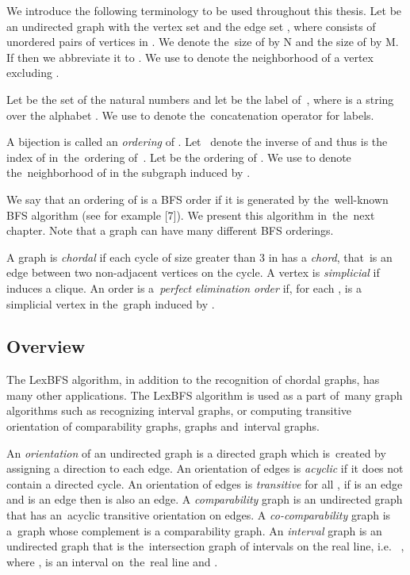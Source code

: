 \documentclass[a4paper, 11pt]{article}
\begin{document}
We introduce the following terminology to be used throughout this thesis. Let  be 
an undirected graph with the vertex set  and the edge set , where  consists of unordered 
pairs of vertices in . We denote the~size of  by N and the size of  by M. If  
then we abbreviate it to . We use  to denote the neighborhood of a vertex  
excluding . 

Let  be the set of the natural numbers and let  be the label of~, where 
 is a string over the alphabet . We use  to denote the~concatenation 
operator for labels.

A bijection  is called an \textit{ordering} of .
Let~ denote the inverse of  and thus  is the index of  
in~the~ordering of~. Let  be the ordering of . We use  to
denote the~neighborhood of  in the subgraph induced by .

We say that an ordering  of  is a BFS order if it is generated by the~well-known 
BFS algorithm (see for example [7]). We present this algorithm in~the~next chapter. 
Note that a graph can have many different BFS orderings.

A graph  is \textit{chordal} if each cycle of size greater than 3 in  has a \textit{chord}, 
that~is an edge between two non-adjacent vertices on the cycle. A vertex  is \textit{simplicial} 
if  induces a clique. An order  is a~\textit{perfect elimination order} 
if, for each ,  is a simplicial vertex in the~graph induced by .



\subsection{Overview}

The LexBFS algorithm, in addition to the recognition of chordal graphs, has many other applications. 
The LexBFS algorithm is used as a part of~many graph algorithms such as recognizing interval graphs, 
or computing transitive orientation of comparability graphs,  graphs
and~interval graphs.

An \textit{orientation} of an undirected graph  is a directed graph which is~created by assigning 
a direction to each edge. An orientation of edges is \textit{acyclic} if it does not contain a directed 
cycle. An orientation of edges is \textit{transitive} for all , if  is an edge 
and  is an edge then  is also an edge. A \textit{comparability} graph 
is an undirected graph that has an~acyclic transitive orientation on edges. A \textit{co-comparability} 
graph is a~graph  whose complement  is a comparability graph. An \textit{interval} 
graph  is an undirected graph that is the~intersection graph of intervals on the real line, i.e.~
, where ,   is an interval on~the~real line 
and . 
\end{document}
